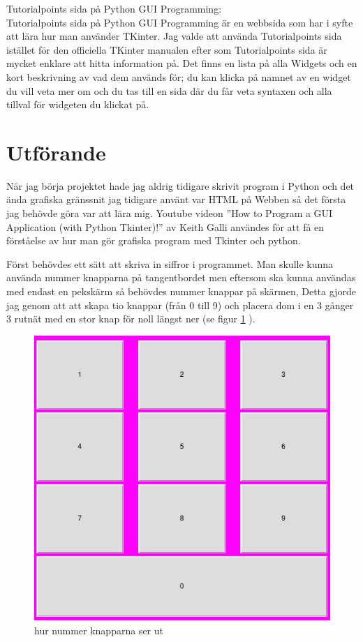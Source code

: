 \documentclass[a4paper, 12pt]{article}
\begin{document}
Tutorialpoints sida på Python GUI Programming:\\
Tutorialpoints sida på Python GUI Programming är en webbsida som har i syfte att lära hur man använder TKinter.
Jag valde att använda Tutorialpoints sida istället för den officiella TKinter manualen efter som Tutorialpoints sida är mycket enklare att hitta information på. Det finns en lista på alla Widgets och en kort beskrivning av vad dem används för; du kan klicka på namnet av en widget du vill veta mer om och du tas till en sida där du får veta syntaxen och alla tillval för widgeten du klickat på.

\section{Utförande}

När jag börja projektet hade jag aldrig tidigare skrivit program i Python och det ända grafiska gränssnit jag tidigare använt var HTML på Webben så det första jag behövde göra var att lära mig.
Youtube videon ''How to Program a GUI Application (with Python Tkinter)!'' av Keith Galli\cite{yt:galli} användes för att få en förståelse av hur man gör grafiska program med Tkinter och python. 

Först behövdes ett sätt att skriva in siffror i programmet.
Man skulle kunna använda nummer knapparna på tangentbordet men eftersom ska kunna användas med endast en pekskärm så behövdes nummer knappar på skärmen, Detta gjorde jag genom att att skapa tio knappar (från 0 till 9)  och placera dom i en 3 gånger 3 rutnät med en stor knap för noll längst ner (se figur \ref{fig:numpad} ).


\begin{figure}[h!]
  \includegraphics[width=\linewidth]{img/numpad.png}
  \caption{hur nummer knapparna ser ut}
  \label{fig:numpad}
\end{figure}
\end{document}
